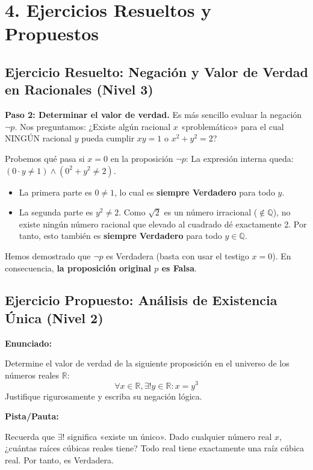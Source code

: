 \documentclass[11pt]{article}
\newenvironment{ejercicios}{\section*{4. Ejercicios Resueltos y Propuestos}}{}
\newenvironment{ejercicioresuelto}[2]{\subsection*{Ejercicio Resuelto: #1 \hfill \normalfont\small(#2)}}{ }
\newcommand{\enunciado}[1]{\textbf{Enunciado:}\par#1\par\medskip}
\newenvironment{ejerciciopropuesto}[2]{\subsection*{Ejercicio Propuesto: #1 \hfill \normalfont\small(#2)}}{ }
\newcommand{\pista}[1]{\textbf{Pista/Pauta:}\par#1\par\bigskip}
\begin{document}
\begin{ejercicios}
\begin{ejercicioresuelto}{Negación y Valor de Verdad en Racionales}{Nivel 3}
{      \textbf{Paso 2: Determinar el valor de verdad.}
      Es más sencillo evaluar la negación $\neg p$. Nos preguntamos: ¿Existe algún racional $x$ «problemático» para el cual NINGÚN racional $y$ pueda cumplir $xy=1$ o $x^2+y^2=2$?
      
      Probemos qué pasa si \textbf{$x = 0$} en la proposición $\neg p$:
      La expresión interna queda: $(0 \cdot y \neq 1) \wedge (0^2 + y^2 \neq 2)$.
      \begin{itemize}
          \item La primera parte es $0 \neq 1$, lo cual es \textbf{siempre Verdadero} para todo $y$.
          \item La segunda parte es $y^2 \neq 2$. Como $\sqrt{2}$ es un número irracional ($\notin \mathbb{Q}$), no existe ningún número racional que elevado al cuadrado dé exactamente 2. Por tanto, esto también es \textbf{siempre Verdadero} para todo $y \in \mathbb{Q}$.
      \end{itemize}
      
      Hemos demostrado que $\neg p$ es Verdadera (basta con usar el testigo $x=0$). 
      En consecuencia, \textbf{la proposición original $p$ es Falsa}.
    }
  \end{ejercicioresuelto}

  \begin{ejerciciopropuesto}{Análisis de Existencia Única}{Nivel 2}
    \enunciado{
      Determine el valor de verdad de la siguiente proposición en el universo de los números reales $\mathbb{R}$:
      \[ \forall x \in \mathbb{R}, \exists! y \in \mathbb{R} : x = y^3 \]
      Justifique rigurosamente y escriba su negación lógica.
    }
    \pista{
      Recuerda que $\exists!$ significa «existe un único». Dado cualquier número real $x$, ¿cuántas raíces cúbicas reales tiene? Todo real tiene exactamente una raíz cúbica real. Por tanto, es Verdadera.
    }
  \end{ejerciciopropuesto}

\end{ejercicios}
\end{document}
